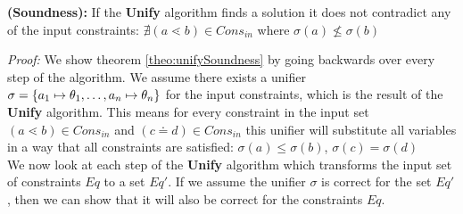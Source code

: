 \documentclass[acmsmall,screen,review]{acmart}
\begin{document}
\begin{theoremAndi}
  \label{theo:unifySoundness}
  \textbf{(Soundness):}
  If the \textbf{Unify} algorithm finds a solution it does not contradict any of the input constraints:
  $\nexists (a \lessdot b) \in {Cons}_{in}$ where $\sigma(a) \nleq \sigma(b)$  
\end{theoremAndi}
\textit{Proof:}
We show theorem \ref{theo:unifySoundness} by going backwards over every step of the algorithm.
We assume there exists a unifier $\sigma = \{ a_1 \mapsto \theta_1, \ldots , a_n \mapsto \theta_n \}$ for the input constraints,
which is the result of the \textbf{Unify} algorithm.
This means for every constraint in the input set $(a \lessdot b) \in {Cons}_{in}$ and $(c \doteq d) \in {Cons}_{in}$
this unifier will substitute all variables in a way that all constraints are satisfied:
$\sigma(a) \leq \sigma(b)$, $\sigma(c) = \sigma(d)$\\

We now look at each step of the \textbf{Unify} algorithm
which transforms the input set of constraints $Eq$ to a set $Eq'$.
If we assume the unifier $\sigma$ is correct for the set $Eq'$,
then we can show that it will also be correct for the constraints $Eq$. 


\end{document}
